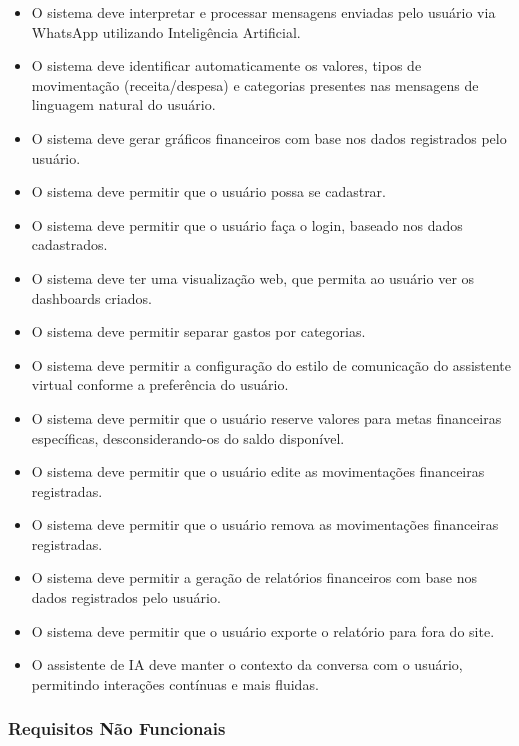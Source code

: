 \begin{itemize}
    \item O sistema deve interpretar e processar mensagens enviadas pelo usuário via WhatsApp utilizando Inteligência Artificial.
    \item O sistema deve identificar automaticamente os valores, tipos de movimentação (receita/despesa) e categorias presentes nas mensagens de linguagem natural do usuário.
    \item O sistema deve gerar gráficos financeiros com base nos dados registrados pelo usuário.
    \item O sistema deve permitir que o usuário possa se cadastrar.
    \item O sistema deve permitir que o usuário faça o login, baseado nos dados cadastrados.
    \item O sistema deve ter uma visualização web, que permita ao usuário ver os dashboards criados.
    \item O sistema deve permitir separar gastos por categorias.
    \item O sistema deve permitir a configuração do estilo de comunicação do assistente virtual conforme a preferência do usuário.
    \item O sistema deve permitir que o usuário reserve valores para metas financeiras específicas, desconsiderando-os do saldo disponível.
    \item O sistema deve permitir que o usuário edite as movimentações financeiras registradas.
    \item O sistema deve permitir que o usuário remova as movimentações financeiras registradas.
    \item O sistema deve permitir a geração de relatórios financeiros com base nos dados registrados pelo usuário.
    \item O sistema deve permitir que o usuário exporte o relatório para fora do site.
    \item O assistente de IA deve manter o contexto da conversa com o usuário, permitindo interações contínuas e mais fluidas.
\end{itemize}

\subsubsection{Requisitos Não Funcionais}

